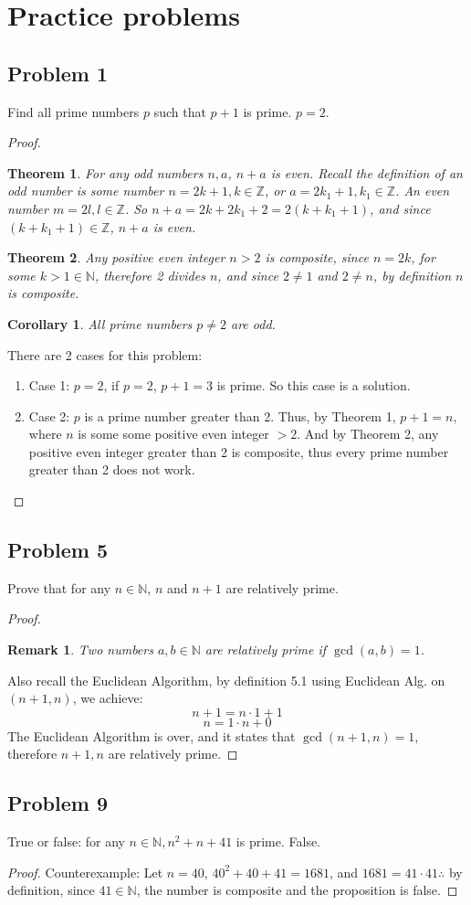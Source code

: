 \documentclass[12pt]{article}
\title{\scalebox{2}{Math 341 Homework 6}}
\author{\scalebox{1.5}{Theo Koss}}
\date{September 2020}
\newtheorem{theorem}{Theorem}
\newtheorem{corollary}{Corollary}[theorem]
\newtheorem*{remark}{Remark}
\newcommand{\N}{\mathbb{N}}
\newcommand{\Z}{\mathbb{Z}}
\begin{document}
\maketitle
\section{Practice problems}
\subsection{Problem 1}
Find all prime numbers $p$ such that $p+1$ is prime.
\newline $p=2$.
\begin{proof}
\begin{theorem}
For any odd numbers $n,a$, $n+a$ is even. Recall the definition of an odd number is some number $n=2k+1,k\in\Z$, or $a=2k_1+1,k_1\in\Z$. An even number $m=2l,l\in\Z$. So $n+a=2k+2k_1+2=2(k+k_1+1)$, and since $(k+k_1+1)\in\Z$, $n+a$ is even.
\end{theorem}
\begin{theorem}
\label{thm2}
Any positive even integer $n>2$ is composite, since $n=2k$, for some $k>1\in\N$, therefore 2 divides $n$, and since $2\neq1$ and $2\neq n$, by definition $n$ is composite.
\end{theorem}
\begin{corollary}
All prime numbers $p\neq2$ are odd.
\end{corollary}
There are 2 cases for this problem:
\begin{enumerate}
    \item Case 1: $p=2$, if $p=2$, $p+1=3$ is prime. So this case is a solution.
    \item Case 2: $p$ is a prime number greater than 2. Thus, by Theorem 1, $p+1=n$, where $n$ is some some positive even integer $>2$. And by Theorem 2, any positive even integer greater than 2 is composite, thus every prime number greater than 2 does not work.
\end{enumerate}
\end{proof}
\subsection{Problem 5}
Prove that for any $n\in\N$, $n$ and $n+1$ are relatively prime.
\begin{proof}
\begin{remark}Two numbers $a,b\in\N$ are relatively prime if $\gcd(a,b)=1$.\end{remark}
Also recall the Euclidean Algorithm, by definition 5.1 using Euclidean Alg. on $(n+1,n)$, we achieve:$$n+1=n\cdot1+1$$ $$n=1\cdot n+0$$
The Euclidean Algorithm is over, and it states that $\gcd(n+1,n)=1$, therefore $n+1,n$ are relatively prime.
\end{proof}
\subsection{Problem 9}
True or false: for any $n\in\N, n^2+n+41$ is prime.
False.
\begin{proof}
Counterexample: Let $n=40$, $40^2+40+41=1681$, and $1681=41\cdot41 \therefore$ by definition, since $41\in\N$, the number is composite and the proposition is false.
\end{proof}
\end{document}
